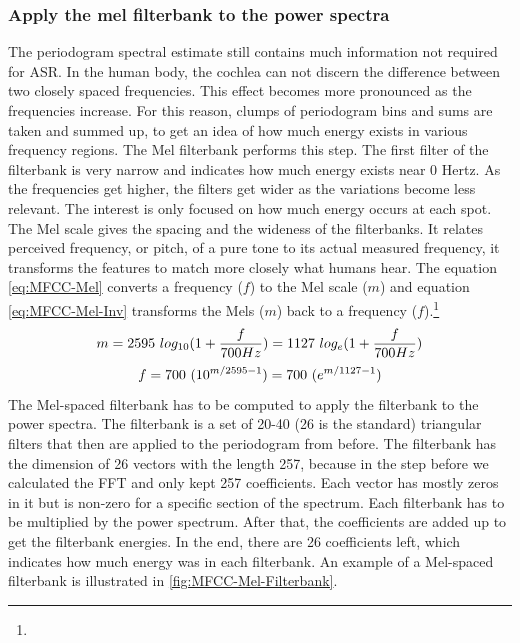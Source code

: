 \subsubsection{Apply the mel filterbank to the power spectra}
The periodogram spectral estimate still contains much information not required for \gls{ASR}. In the human body, the cochlea can not discern the difference between two closely spaced frequencies. This effect becomes more pronounced as the frequencies increase. For this reason, clumps of periodogram bins and sums are taken and summed up, to get an idea of how much energy exists in various frequency regions.
\newline
\newline
The Mel filterbank performs this step. The first filter of the filterbank is very narrow and indicates how much energy exists near 0 Hertz. As the frequencies get higher, the filters get wider as the variations become less relevant. The interest is only focused on how much energy occurs at each spot. The Mel scale gives the spacing and the wideness of the filterbanks. It relates perceived frequency, or pitch, of a pure tone to its actual measured frequency, it transforms the features to match more closely what humans hear. The equation \ref{eq:MFCC-Mel} converts a frequency ($f$) to the Mel scale ($m$) and equation \ref{eq:MFCC-Mel-Inv} transforms the Mels ($m$) back to a frequency ($f$).\footnote{}
\begin{equation}
    \centering
    m = 2595 \ log_{10}(1 + \frac{f}{700Hz}) = 1127 \ log_e(1 + \frac{f}{700Hz})
    \label{eq:MFCC-Mel}
\end{equation}
\begin{equation}
    \centering
    f = 700 \ (10^{m/2595-1}) = 700 \ (e^{m/1127-1})
    \label{eq:MFCC-Mel-Inv}
\end{equation}
The Mel-spaced filterbank has to be computed to apply the filterbank to the power spectra. The filterbank is a set of 20-40 (26 is the standard) triangular filters that then are applied to the periodogram from before. The filterbank has the dimension of 26 vectors with the length 257, because in the step before we calculated the \gls{FFT} and only kept 257 coefficients. Each vector has mostly zeros in it but is non-zero for a specific section of the spectrum. Each filterbank has to be multiplied by the power spectrum. After that, the coefficients are added up to get the filterbank energies. In the end, there are 26 coefficients left, which indicates how much energy was in each filterbank. An example of a Mel-spaced filterbank is illustrated in \ref{fig:MFCC-Mel-Filterbank}.
